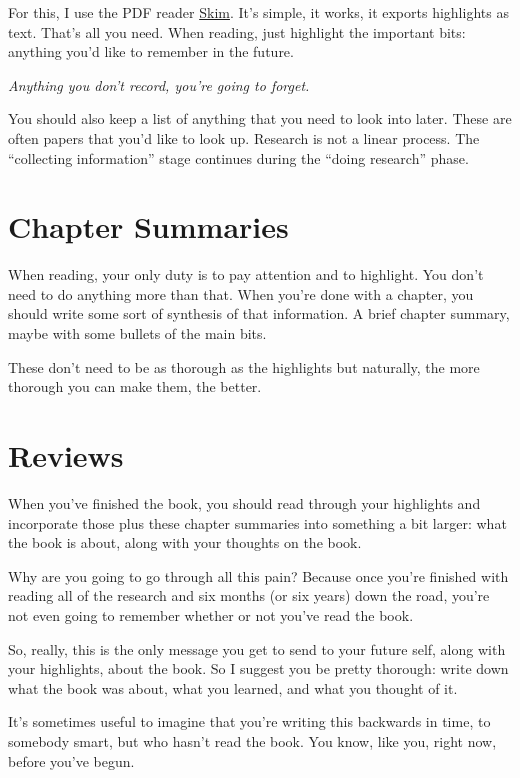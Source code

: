 For this, I use the PDF reader \href{http://skim-app.sourceforge.net/}{Skim}. It's simple, it works, it exports
highlights as text. That's all you need. When reading, just
highlight the important bits: anything you'd like to remember in the future.

\textit{Anything you don't record, you're going to forget.}

You should also keep a list of anything that you need to look into later. These are
often papers that you'd like to look up. Research is not a linear process. The
``collecting information'' stage continues during the ``doing research'' phase.

\section{Chapter Summaries}

When reading, your only duty is to pay attention and to highlight. You don't
need to do anything more than that. When you're done with a chapter, you should
write some sort of synthesis of that information. A brief chapter summary, maybe
with some bullets of the main bits.

These don't need to be as thorough as the highlights but naturally, the more
thorough you can make them, the better.

\section{Reviews}

When you've finished the book, you should read through your highlights
and incorporate those plus these chapter
summaries into something a bit larger: what the book is about, along with your
thoughts on the book.

Why are you going to go through all this pain? Because once you're finished
with reading all of the research and six months (or six years) down the road,
you're not even going to remember whether or not you've read the book.

So, really, this is the only message you get to send to your future self, along
with your highlights, about the book. So I suggest you be pretty
thorough: write down what the book was about, what you learned, and what you
thought of it.

It's sometimes useful to imagine that you're writing this backwards in time, to
somebody smart, but who hasn't read the book. You know, like you, right now,
before you've begun.

